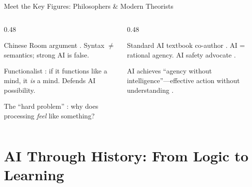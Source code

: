 ﻿\documentclass[aspectratio=169,11pt]{beamer}
\begin{document}
\begin{frame}{Meet the Key Figures: Philosophers \& Modern Theorists}
\begin{columns}[T]
\begin{column}{0.48\textwidth}
\begin{figurebox}
\scriptsize
Chinese Room argument \parencite{searle_minds_brains}. Syntax $\neq$ semantics; strong AI is false.
\end{figurebox}

\vspace{0.05em}
\begin{figurebox}
\scriptsize
Functionalist \parencite{dennett_consciousness}: if it functions like a mind, it \emph{is} a mind. Defends AI possibility.
\end{figurebox}

\vspace{0.05em}
\begin{figurebox}
\scriptsize
The ``hard problem'' \parencite{chalmers_conscious_mind}: why does processing \emph{feel} like something?
\end{figurebox}
\end{column}
\begin{column}{0.48\textwidth}
\begin{figurebox}
\scriptsize
Standard AI textbook co-author \parencite{russell_norvig_ai}. AI = rational agency. AI safety advocate \parencite{russell_human_compatible}.
\end{figurebox}

\vspace{0.05em}
\begin{figurebox}
\scriptsize
AI achieves ``agency without intelligence''---effective action without understanding \parencite{floridi_ethics_ai}.
\end{figurebox}
\end{column}
\end{columns}
\end{frame}

\section{AI Through History: From Logic to Learning}
\end{document}
